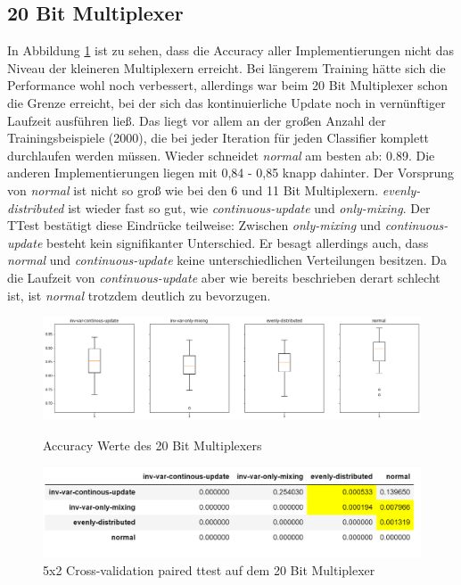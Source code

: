 \documentclass[10pt]{ocsmnar}
\begin{document}
\subsection{20 Bit Multiplexer}

In Abbildung \ref{boxplot-20-bit} ist zu sehen, dass die Accuracy aller Implementierungen nicht das Niveau der kleineren Multiplexern erreicht. Bei längerem Training hätte sich die Performance wohl noch verbessert, allerdings war beim 20 Bit Multiplexer schon die Grenze erreicht, bei der sich das kontinuierliche Update noch in vernünftiger Laufzeit ausführen ließ. Das liegt vor allem an der großen Anzahl der Trainingsbeispiele (2000), die bei jeder Iteration für jeden Classifier komplett durchlaufen werden müssen. 
Wieder schneidet \textit{normal} am besten ab: 0.89. Die anderen Implementierungen liegen mit 0,84 - 0,85 knapp dahinter. Der Vorsprung von \textit{normal} ist nicht so groß wie bei den 6 und 11 Bit Multiplexern.
\textit{evenly-distributed} ist wieder fast so gut, wie \textit{continuous-update} und \textit{only-mixing}.  
Der TTest bestätigt diese Eindrücke teilweise: Zwischen \textit{only-mixing} und \textit{continuous-update} besteht kein signifikanter Unterschied. Er besagt allerdings auch, dass \textit{normal} und \textit{continuous-update} keine unterschiedlichen Verteilungen besitzen. Da die Laufzeit von \textit{continuous-update} aber wie bereits beschrieben derart schlecht ist, ist \textit{normal} trotzdem deutlich zu bevorzugen. 


\begin{figure}[h]
    \includegraphics[width=\linewidth]{img/boxplot_20_bit.png}
    \caption{Accuracy Werte des 20 Bit Multiplexers}
    \label{boxplot-20-bit}
\end{figure}


\begin{figure}[h]
    \includegraphics[width=\linewidth]{img/ttest_20_bit.png}
    \caption{5x2 Cross-validation paired ttest auf dem 20 Bit Multiplexer}\label{ttest-20-bit}
\end{figure}
\end{document}
